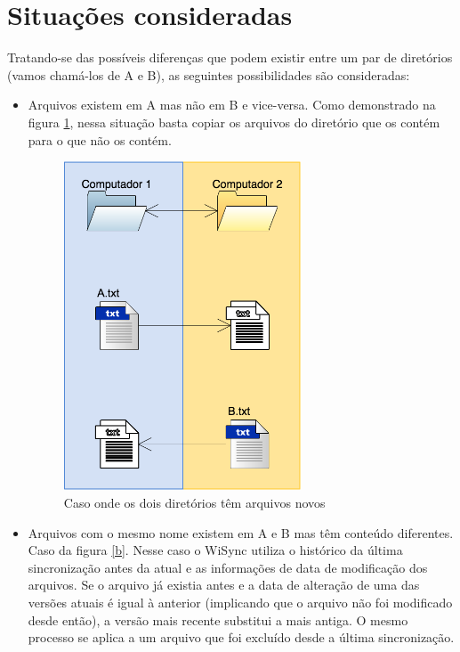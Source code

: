 \documentclass[12pt,a4paper]{ufpr}
\begin{document}
\section{Situações consideradas}
Tratando-se das possíveis diferenças que podem existir entre um par de diretórios (vamos chamá-los de A e B), as seguintes possibilidades são consideradas:
\begin{itemize}
  \item Arquivos existem em A mas não em B e vice-versa. Como demonstrado na figura \ref{a}, nessa situação basta copiar os arquivos do diretório que os contém para o que não os contém.
  \begin{figure}[h]
    \centering
    \includegraphics[width=200pt]{img/a.png}
    \caption{Caso onde os dois diretórios têm arquivos novos}
    \label{a}
  \end{figure}
  \item Arquivos com o mesmo nome existem em A e B mas têm conteúdo diferentes. Caso da figura \ref{b}. Nesse caso o WiSync utiliza o histórico da última sincronização antes da atual e as informações de data de modificação dos arquivos. Se o arquivo já existia antes e a data de alteração de uma das versões atuais é igual à anterior (implicando que o arquivo não foi modificado desde então), a versão mais recente substitui a mais antiga. O mesmo processo se aplica a um arquivo que foi excluído desde a última sincronização.
  \begin{figure}[h]
    \centering

\end{figure}
\end{itemize}
\end{document}

